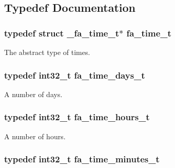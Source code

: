 \subsection{Typedef Documentation}
\hypertarget{group___fa_time_ga227cc693f20b4873fed11028bcade184}{
\subsubsection[{fa\-\_\-time\-\_\-t}]{\setlength{\rightskip}{0pt plus 5cm}typedef struct \-\_\-fa\-\_\-time\-\_\-t$\ast$ {\bf fa\-\_\-time\-\_\-t}}}\label{group___fa_time_ga227cc693f20b4873fed11028bcade184}


The abstract type of times. 

\hypertarget{group___fa_time_ga126d90b34014d28bf3f4930b5e370598}{
\subsubsection[{fa\-\_\-time\-\_\-days\-\_\-t}]{\setlength{\rightskip}{0pt plus 5cm}typedef int32\-\_\-t {\bf fa\-\_\-time\-\_\-days\-\_\-t}}}\label{group___fa_time_ga126d90b34014d28bf3f4930b5e370598}


A number of days. 

\hypertarget{group___fa_time_gabb41271106b33206f546a0cb3b56a33e}{
\subsubsection[{fa\-\_\-time\-\_\-hours\-\_\-t}]{\setlength{\rightskip}{0pt plus 5cm}typedef int32\-\_\-t {\bf fa\-\_\-time\-\_\-hours\-\_\-t}}}\label{group___fa_time_gabb41271106b33206f546a0cb3b56a33e}


A number of hours. 

\hypertarget{group___fa_time_ga1103d61f9fdf2839e8cc15ee5fac7b4e}{
\subsubsection[{fa\-\_\-time\-\_\-minutes\-\_\-t}]{\setlength{\rightskip}{0pt plus 5cm}typedef int32\-\_\-t {\bf fa\-\_\-time\-\_\-minutes\-\_\-t}}}\label{group___fa_time_ga1103d61f9fdf2839e8cc15ee5fac7b4e}


